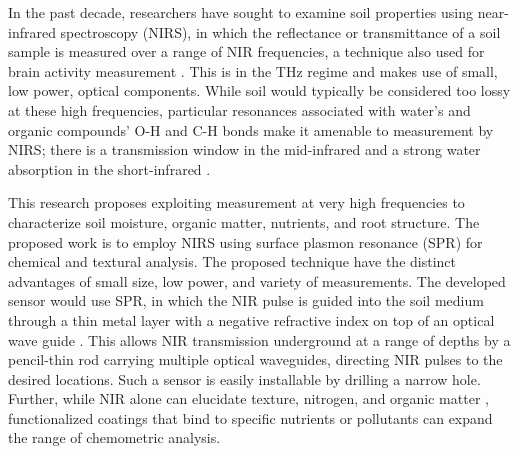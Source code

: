 \documentclass[10pt,letterpaper]{article}
\begin{document}
In the past decade, researchers have sought to examine soil properties using near-infrared spectroscopy (NIRS), in which the reflectance or transmittance of a soil sample is measured over a range of NIR frequencies, a technique also used for brain activity measurement \cite{matsuyama2009design}. This is in the THz regime and makes use of small, low power, optical components. While soil would typically be considered too lossy at these high frequencies, particular resonances associated with water's and organic compounds' O-H and C-H bonds make it amenable to measurement by NIRS; there is a transmission window in the mid-infrared and a strong water absorption in the short-infrared \cite{lewis2017invited, rodionov2014sensing}. %

This research proposes exploiting measurement at very high frequencies to characterize soil moisture, organic matter, nutrients, and root structure. The proposed work is to employ NIRS using surface plasmon resonance (SPR) for chemical and textural analysis. The proposed technique have the distinct advantages of small size, low power, and variety of measurements. The developed sensor would use SPR, in which the NIR pulse is guided into the soil medium through a thin metal layer with a negative refractive index on top of an optical wave guide \cite{shibayama2016surface}. This allows NIR transmission underground at a range of depths by a pencil-thin rod carrying multiple optical waveguides, directing NIR pulses to the desired locations. Such a sensor is easily installable by drilling a narrow hole. Further, while NIR alone can elucidate texture, nitrogen, and organic matter \cite{chang2001near, sorensen2005determination}, functionalized coatings that bind to specific nutrients or pollutants can expand the range of chemometric analysis. %
\end{document}
